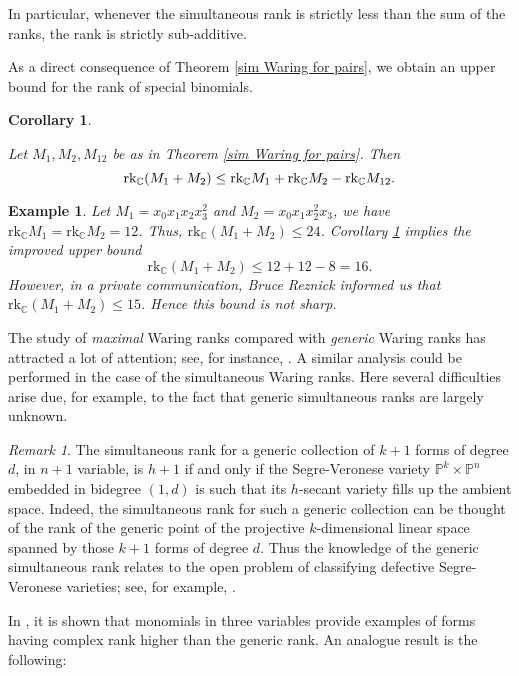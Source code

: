 \documentclass{amsart}
\theoremstyle{plain}
\newtheorem{corollary}[theorem]{Corollary}
\newtheorem{example}[theorem]{Example}
\theoremstyle{definition}
\theoremstyle{remark}
\newtheorem{remark}{Remark}[section]
\newcommand{\rk}{\mathrm{rk}}
\newcommand{\CC}{\mathbb{C}}
\begin{document}
\noindent In particular, whenever the simultaneous rank is strictly less than the sum of the ranks, the rank is strictly sub-additive.

As a direct consequence of Theorem \ref{sim Waring for pairs}, we obtain an upper bound for the rank of special binomials.
\begin{corollary}\label{rankofbinomial}

Let $M_1, M_2, M_{12}$ be as in Theorem  \ref{sim Waring for pairs}. Then \[\textnormal{rk}_{\mathbb C}(M_1+M_2)\leq \textnormal{rk}_{\mathbb C} M_1+\textnormal{rk}_{\mathbb C} M_2 - \textnormal{rk}_{\mathbb C} M_{12}.\]

\end{corollary}


\begin{example}
Let $M_1=x_0x_1x_2x_3^2$ and $M_2=x_0x_1x_2^2x_3$, we have $\rk_{\CC} M_1=\rk_{\CC} M_2=12$. Thus, $\rk_{\CC} (M_1+M_2)\leq 24$. Corollary \ref{rankofbinomial} implies the improved upper bound
\[\rk_{\CC} (M_1+M_2)\leq 12+12-8=16.\]
However, in a private communication, Bruce Reznick informed us that $\rk_{\CC} (M_1+M_2)\leq 15$. Hence this bound is not sharp.
\end{example}


\noindent The study of {\em maximal} Waring ranks compared with {\em generic} Waring ranks has attracted a lot of attention; see, for instance, \cite{BT2015,BT2016,BHMT2017}. A similar analysis could be performed in the case of the simultaneous Waring ranks. Here several difficulties arise due, for example, to the fact that generic simultaneous ranks are largely unknown.

\begin{remark}
The simultaneous rank for a generic collection of $k+1$ forms of degree $d$, in $n+1$ variable, is $h+1$ if and only if the Segre-Veronese variety $\mathbb{P}^k\times\mathbb{P}^n$ embedded in bidegree $(1,d)$ is such that its $h$-secant variety fills up the ambient space. Indeed, the simultaneous rank for such a generic collection can be thought of the rank of the generic point of the projective $k$-dimensional linear space spanned by those $k+1$ forms of degree $d$. Thus the knowledge of the generic simultaneous rank relates to the open problem of classifying defective Segre-Veronese varieties; see, for example, \cite{BBC2012}.
\end{remark}

In \cite{CCG}, it is shown that monomials in three variables provide examples of forms having complex rank higher than the generic rank. An analogue result is the following:
\end{document}
